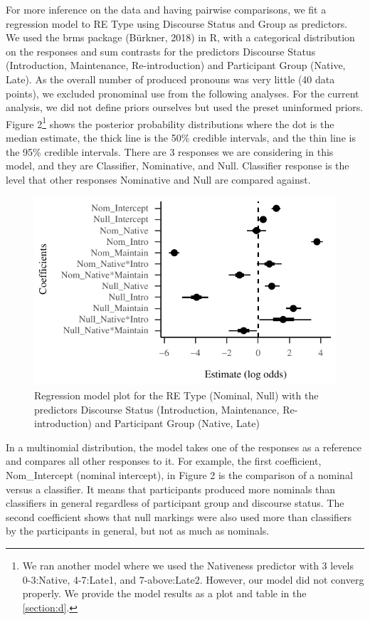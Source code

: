 \documentclass[]{elsarticle} %
\begin{document}
For more inference on the data and having pairwise comparisons, we fit a
regression model to RE Type using Discourse Status and Group as
predictors. We used the brms package (Bürkner, 2018) in R, with a
categorical distribution on the responses and sum contrasts for the
predictors Discourse Status (Introduction, Maintenance, Re-introduction)
and Participant Group (Native, Late). As the overall number of produced
pronouns was very little (40 data points), we excluded pronominal use
from the following analyses. For the current analysis, we did not define
priors ourselves but used the preset uninformed priors. Figure
2\footnote{We ran another model where we used the Nativeness predictor
  with 3 levels 0-3:Native, 4-7:Late1, and 7-above:Late2. However, our
  model did not converg properly. We provide the model results as a plot
  and table in the \ref{section:d}.} shows the posterior probability
distributions where the dot is the median estimate, the thick line is
the 50\% credible intervals, and the thin line is the 95\% credible
intervals. There are 3 responses we are considering in this model, and
they are Classifier, Nominative, and Null. Classifier response is the
level that other responses Nominative and Null are compared against.

\begin{figure}
\centering
\includegraphics{manuscript_v2_files/figure-latex/fig:model-gram-1.pdf}
\caption{Regression model plot for the RE Type (Nominal, Null) with the
predictors Discourse Status (Introduction, Maintenance, Re-introduction)
and Participant Group (Native, Late)}
\end{figure}

In a multinomial distribution, the model takes one of the responses as a
reference and compares all other responses to it. For example, the first
coefficient, Nom\_Intercept (nominal intercept), in Figure 2 is the
comparison of a nominal versus a classifier. It means that participants
produced more nominals than classifiers in general regardless of
participant group and discourse status. The second coefficient shows
that null markings were also used more than classifiers by the
participants in general, but not as much as nominals.
\end{document}
